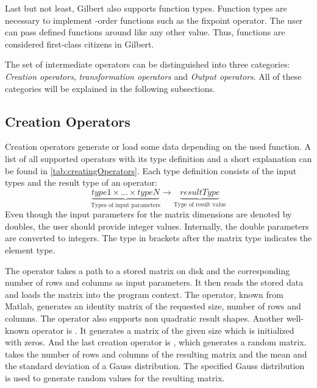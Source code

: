 Last but not least, Gilbert also supports function types.
Function types are necessary to implement -order functions such as the fixpoint operator.
The user can pass defined functions around like any other value.
Thus, functions are considered first-class citizens in Gilbert.

The set of intermediate operators can be distinguished into three categories: \emph{Creation operators}, \emph{transformation operators} and \emph{Output operators}.
All of these categories will be explained in the following subsections.

\subsection{Creation Operators}

Creation operators generate or load some data depending on the used function.
A list of all supported operators with its type definition and a short explanation can be found in \cref{tab:creatingOperators}.
Each type definition consists of the input types and the result type of an operator:
\begin{displaymath}
	\underbrace{type1 \times \ldots \times typeN}_{\text{Types of input parameters}} \rightarrow \underbrace{resultType}_{\text{Type of result value}}
\end{displaymath}
Even though the input parameters for the matrix dimensions are denoted by doubles, the user should provide integer values.
Internally, the double parameters are converted to integers.
The type in brackets after the matrix type indicates the element type.

The  operator takes a path to a stored matrix on disk and the corresponding number of rows and columns as input parameters.
It then reads the stored data and loads the matrix into the program context.
The  operator, known from Matlab, generates an identity matrix of the requested size, number of rows and columns.
The operator also supports non quadratic result shapes.
Another well-known operator is .
It generates a matrix of the given size which is initialized with zeros.
And the last creation operator is , which generates a random matrix.
 takes the number of rows and columns of the resulting matrix and the mean and the standard deviation of a Gauss distribution.
The specified Gauss distribution is used to generate random values for the resulting matrix.

